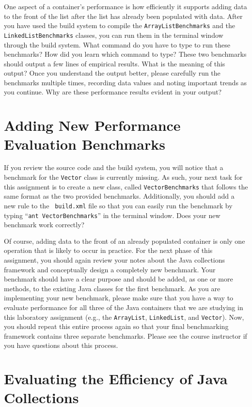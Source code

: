 One aspect of a container's performance is how efficiently it supports adding data to the front of the list after the
list has already been populated with data. After you have used the build system to compile the {\tt ArrayListBenchmarks}
and the {\tt LinkedListBenchmarks} classes, you can run them in the terminal window through the build system. What
command do you have to type to run these benchmarks? How did you learn which command to type? These two benchmarks
should output a few lines of empirical results. What is the meaning of this output? Once you understand the output
better, please carefully run the benchmarks multiple times, recording data values and noting important trends as you
continue. Why are these performance results evident in your output?

\section*{Adding New Performance Evaluation Benchmarks}

If you review the source code and the build system, you will notice that a benchmark for the {\tt Vector} class is
currently missing. As such, your next task for this assignment is to create a new class, called {\tt VectorBenchmarks}
that follows the same format as the two provided benchmarks. Additionally, you should add a new rule to the {\tt
build.xml} file so that you can easily run the benchmark by typing ``{\tt ant VectorBenchmarks}'' in the terminal
window. Does your new benchmark work correctly?

Of course, adding data to the front of an already populated container is only one operation that is likely to occur in
practice. For the next phase of this assignment, you should again review your notes about the Java collections framework
and conceptually design a completely new benchmark. Your benchmark should have a clear purpose and should be added, as
one or more methods, to the existing Java classes for the first benchmark. As you are implementing your new benchmark,
please make sure that you have a way to evaluate performance for all three of the Java containers that we are studying
in this laboratory assignment (e.g., the {\tt ArrayList}, {\tt LinkedList}, and {\tt Vector}). Now, you should repeat
this entire process again so that your final benchmarking framework contains three separate benchmarks. Please see the
course instructor if you have questions about this process.

\section*{Evaluating the Efficiency of Java Collections}


